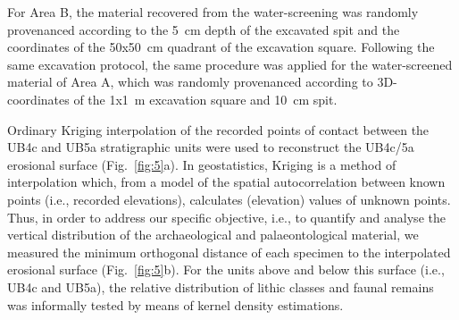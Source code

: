 \documentclass[preprint,authoryear,times]{elsarticle} %
\begin{document}
\begin{table}[]
  \caption{List of sampled observations for the vertical distribution and point pattern analyses.}
  \label{tab:2}
  \vspace{0.1in}
\end{table}

For Area B, the material recovered from the water-screening was randomly provenanced according to the 5~cm depth of the excavated spit and the coordinates of the 50x50~cm quadrant of the excavation square. Following the same excavation protocol, the same procedure was applied for the water-screened material of Area A, which was randomly provenanced according to 3D-coordinates of the 1x1~m excavation square and 10~cm spit.

Ordinary Kriging interpolation of the recorded points of contact between the UB4c and UB5a stratigraphic units were used to reconstruct the UB4c/5a erosional surface (Fig.~\ref{fig:5}a). In geostatistics, Kriging is a method of interpolation which, from a model of the spatial autocorrelation between known points (i.e., recorded elevations), calculates (elevation) values of unknown points. Thus, in order to address our specific objective, i.e., to quantify and analyse the vertical distribution of the archaeological and palaeontological material, we measured the minimum orthogonal distance of each specimen to the interpolated erosional surface (Fig.~\ref{fig:5}b). For the units above and below this surface (i.e., UB4c and UB5a), the relative distribution of lithic classes and faunal remains was informally tested by means of kernel density estimations.
\end{document}

